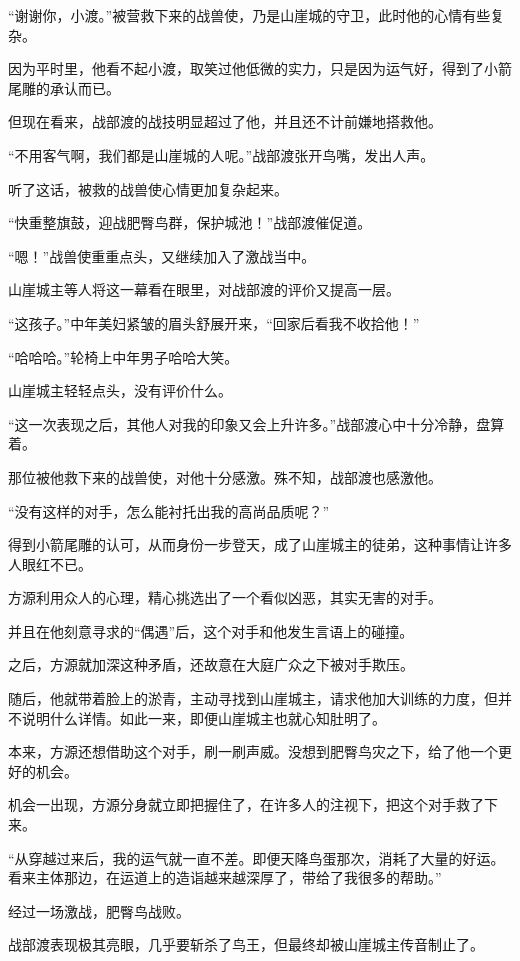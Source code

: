 \begin{this_body}
“谢谢你，小渡。”被营救下来的战兽使，乃是山崖城的守卫，此时他的心情有些复杂。

因为平时里，他看不起小渡，取笑过他低微的实力，只是因为运气好，得到了小箭尾雕的承认而已。

但现在看来，战部渡的战技明显超过了他，并且还不计前嫌地搭救他。

“不用客气啊，我们都是山崖城的人呢。”战部渡张开鸟嘴，发出人声。

听了这话，被救的战兽使心情更加复杂起来。

“快重整旗鼓，迎战肥臀鸟群，保护城池！”战部渡催促道。

“嗯！”战兽使重重点头，又继续加入了激战当中。

山崖城主等人将这一幕看在眼里，对战部渡的评价又提高一层。

“这孩子。”中年美妇紧皱的眉头舒展开来，“回家后看我不收拾他！”

“哈哈哈。”轮椅上中年男子哈哈大笑。

山崖城主轻轻点头，没有评价什么。

“这一次表现之后，其他人对我的印象又会上升许多。”战部渡心中十分冷静，盘算着。

那位被他救下来的战兽使，对他十分感激。殊不知，战部渡也感激他。

“没有这样的对手，怎么能衬托出我的高尚品质呢？”

得到小箭尾雕的认可，从而身份一步登天，成了山崖城主的徒弟，这种事情让许多人眼红不已。

方源利用众人的心理，精心挑选出了一个看似凶恶，其实无害的对手。

并且在他刻意寻求的“偶遇”后，这个对手和他发生言语上的碰撞。

之后，方源就加深这种矛盾，还故意在大庭广众之下被对手欺压。

随后，他就带着脸上的淤青，主动寻找到山崖城主，请求他加大训练的力度，但并不说明什么详情。如此一来，即便山崖城主也就心知肚明了。

本来，方源还想借助这个对手，刷一刷声威。没想到肥臀鸟灾之下，给了他一个更好的机会。

机会一出现，方源分身就立即把握住了，在许多人的注视下，把这个对手救了下来。

“从穿越过来后，我的运气就一直不差。即便天降鸟蛋那次，消耗了大量的好运。看来主体那边，在运道上的造诣越来越深厚了，带给了我很多的帮助。”

经过一场激战，肥臀鸟战败。

战部渡表现极其亮眼，几乎要斩杀了鸟王，但最终却被山崖城主传音制止了。


\end{this_body}
